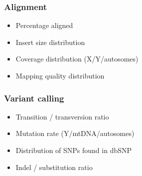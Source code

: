 \documentclass[slidestop,14pt]{beamer}
\begin{document}
{
  \frame{}
}

\begin{frame}
  \frametitle{Alignment}

  \vspace{\baselineskip}

  \begin{itemize}
    \item Percentage aligned
    \item Insert size distribution
    \item Coverage distribution (X/Y/autosomes)
    \item Mapping quality distribution
  \end{itemize}
\end{frame}

{
  \frame{}
}

\begin{frame}
  \frametitle{Variant calling}

  \vspace{\baselineskip}

  \begin{itemize}
    \item Transition / transversion ratio
    \item Mutation rate (Y/mtDNA/autosomes)
    \item Distribution of SNPs found in dbSNP
    \item Indel / substitution ratio
  \end{itemize}
\end{frame}
\end{document}
